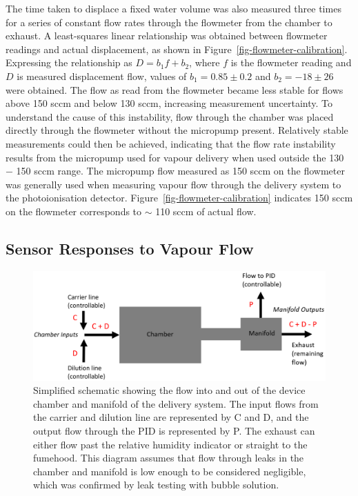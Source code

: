 \documentclass[
  a4paper,
]{scrbook}
\begin{document}
The time taken to displace a fixed water volume was also measured three
times for a series of constant flow rates through the flowmeter from the
chamber to exhaust. A least-squares linear relationship was obtained
between flowmeter readings and actual displacement, as shown in
Figure~\ref{fig-flowmeter-calibration}. Expressing the relationship as
\(D = b_1f + b_2\), where \(f\) is the flowmeter reading and \(D\) is
measured displacement flow, values of \(b_1 = 0.85\pm0.2\) and
\(b_2 = -18\pm26\) were obtained. The flow as read from the flowmeter
became less stable for flows above 150 sccm and below 130 sccm,
increasing measurement uncertainty. To understand the cause of this
instability, flow through the chamber was placed directly through the
flowmeter without the micropump present. Relatively stable measurements
could then be achieved, indicating that the flow rate instability
results from the micropump used for vapour delivery when used outside
the 130 \(-\) 150 sccm range. The micropump flow measured as 150 sccm on
the flowmeter was generally used when measuring vapour flow through the
delivery system to the photoionisation detector.
Figure~\ref{fig-flowmeter-calibration} indicates 150 sccm on the
flowmeter corresponds to \(\sim\) 110 sccm of actual flow.

\hypertarget{sec-responses-to-vapour}{%
\subsection{Sensor Responses to Vapour
Flow}\label{sec-responses-to-vapour}}

\begin{figure}

{\centering \includegraphics[width=1\textwidth,height=\textheight]{figures/ch5/chamber-manifold-v2.png}

}

\caption{\label{fig-chamber-schematic}Simplified schematic showing the
flow into and out of the device chamber and manifold of the delivery
system. The input flows from the carrier and dilution line are
represented by C and D, and the output flow through the PID is
represented by P. The exhaust can either flow past the relative humidity
indicator or straight to the fumehood. This diagram assumes that flow
through leaks in the chamber and manifold is low enough to be considered
negligible, which was confirmed by leak testing with bubble solution.}

\end{figure}
\end{document}
